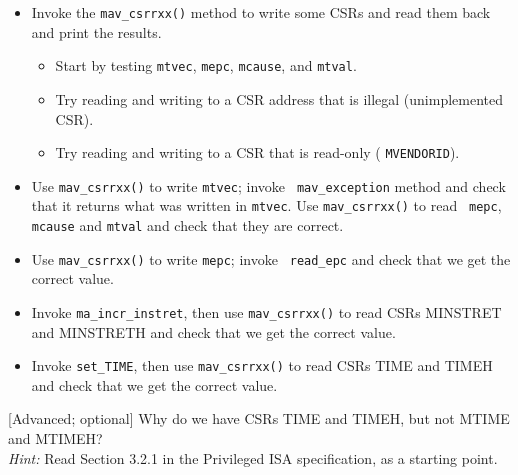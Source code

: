 \begin{itemize}

 \item Invoke the {\tt mav\_csrrxx()} method to write some CSRs and
       read them back and print the results.

 \begin{itemize}
  \item Start by testing {\tt mtvec}, {\tt mepc}, {\tt mcause}, and {\tt mtval}.

  \item Try reading and writing to a CSR address that is illegal (unimplemented CSR).

  \item Try reading and writing to a CSR that is read-only ({\eg} {\tt MVENDORID}).
 \end{itemize}

 \item Use {\tt mav\_csrrxx()} to write {\tt mtvec}; invoke {\tt
       mav\_exception} method and check that it returns what was
       written in {\tt mtvec}.  Use {\tt mav\_csrrxx()} to read {\tt
       mepc}, {\tt mcause} and {\tt mtval} and check that they are
       correct.

 \item Use {\tt mav\_csrrxx()} to write {\tt mepc}; invoke {\tt
       read\_epc} and check that we get the correct value.

 \item Invoke {\tt ma\_incr\_instret}, then use {\tt mav\_csrrxx()} to
       read CSRs MINSTRET and MINSTRETH and check that we get the
       correct value.

 \item Invoke {\tt set\_TIME}, then use {\tt mav\_csrrxx()} to
       read CSRs TIME and TIMEH and check that we get the
       correct value.

\end{itemize}

[Advanced; optional] Why do we have CSRs TIME and TIMEH, but not MTIME
and MTIMEH? \\
\emph{Hint:} Read Section 3.2.1 in the Privileged ISA
specification, as a starting point.






